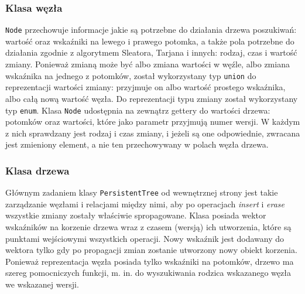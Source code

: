 \documentclass[a4paper,twoside]{article}
\begin{document}
	\subsubsection{Klasa węzła}
	\lstinline|Node| przechowuje informacje jakie są potrzebne do działania drzewa poszukiwań: wartość oraz wskaźniki na lewego i prawego potomka, a także pola potrzebne do działania zgodnie z algorytmem Sleatora, Tarjana i innych: rodzaj, czas i wartość zmiany. Ponieważ zmianą może być albo zmiana wartości w węźle, albo zmiana wskaźnika na jednego z potomków, został wykorzystany typ \lstinline|union| do reprezentacji wartości zmiany: przyjmuje on albo wartość prostego wskaźnika, albo całą nową wartość węzła. Do reprezentacji typu zmiany został wykorzystany typ \lstinline|enum|. Klasa \lstinline|Node| udostępnia na zewnątrz gettery do wartości drzewa: potomków oraz wartości, które jako parametr przyjmują numer wersji. W każdym z nich sprawdzany jest rodzaj i czas zmiany, i jeżeli są one odpowiednie, zwracana jest zmieniony element, a nie ten przechowywany w polach węzła drzewa.
	\subsubsection{Klasa drzewa}
	Głównym zadaniem klasy \lstinline|PersistentTree| od wewnętrznej strony jest takie zarządzanie węzłami i relacjami między nimi, aby po operacjach \textit{insert} i \textit{erase} wszystkie zmiany zostały właściwie spropagowane. Klasa posiada wektor wskaźników na korzenie drzewa wraz z czasem (wersją) ich utworzenia, które są punktami wejściowymi wszystkich operacji. Nowy wskaźnik jest dodawany do wektora tylko gdy po propagacji zmian zostanie utworzony nowy obiekt korzenia. Ponieważ reprezentacja węzła posiada tylko wskaźniki na potomków, drzewo ma szereg pomocniczych funkcji, m. in. do wyszukiwania rodzica wskazanego węzła we wskazanej wersji.
\end{document}
